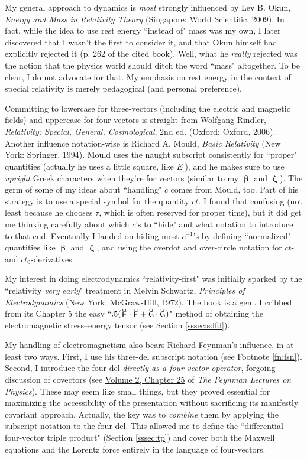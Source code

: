 \documentclass[12pt]{article}
\newcommand{\vvbeta}{\bm{\upbeta}}
\newcommand{\vvzeta}{\bm{\upzeta}}
\newcommand{\tightoverset}[2]{%
  \mathop{#2}\limits^{\vbox to -.5ex{\kern-0.75ex\hbox{$#1$}\vss}}}
\newcommand{\inlinedy}[1]{\tightoverset{\text{\tiny$\bm\leftrightarrow$}}{#1}}
\begin{document}
My general approach to dynamics is \emph{most} strongly influenced by Lev B. Okun, \emph{Energy and Mass in Relativity Theory} (Singapore: World Scientific, 2009). In fact, while the idea to use rest energy ``instead of" mass was my own, I later discovered that I wasn't the first to consider it, and that Okun himself had explicitly rejected it (p. 262 of the cited book). Well, what he \emph{really} rejected was the notion that the physics world should ditch the word ``mass" altogether. To be clear, I do not advocate for that. My emphasis on rest energy in the context of special relativity is merely pedagogical (and personal preference).

Committing to lowercase for three-vectors (including the electric and magnetic fields) and uppercase for four-vectors is straight from Wolfgang Rindler, \emph{Relativity: Special, General, Cosmological}, 2nd ed. (Oxford: Oxford, 2006). Another influence notation-wise is Richard A. Mould, \emph{Basic Relativity} (New York: Springer, 1994). Mould uses the naught subscript consistently for ``proper" quantities (actually he uses a little square, like $E_{{}_\square}$), and he makes sure to use \emph{upright} Greek characters when they're for vectors (similar to my $\vvbeta$ and $\vvzeta$). The germ of some of my ideas about ``handling" $c$ comes from Mould, too. Part of his strategy is to use a special symbol for the quantity $ct$. I found that confusing (not least because he chooses $\tau$, which is often reserved for proper time), but it did get me thinking carefully about which $c$'s to ``hide" and what notation to introduce to that end. Eventually I landed on hiding most $c^{-1}$'s by defining ``normalized" quantities like $\vvbeta$ and $\vvzeta$, and using the overdot and over-circle notation for $ct$- and $ct_0$-derivatives.

My interest in doing electrodynamics ``relativity-first" was initially sparked by the ``relativity \emph{very early}" treatment in Melvin Schwartz, \emph{Principles of Electrodynamics} (New York: McGraw-Hill, 1972). The book is a gem. I cribbed from its Chapter 5 the easy ``$.5 ( \inlinedy{\mathsf{F}} \cdot \inlinedy{\mathsf{F}} + \inlinedy{\mathsf{G}} \cdot \inlinedy{\mathsf{G}} )$" method of obtaining the electromagnetic stress--energy tensor (see Section \ref{sssec:sdfd}).

My handling of electromagnetism also bears Richard Feynman's influence, in at least two ways. First, I use his three-del subscript notation (see Footnote \ref{fn:fsn}). Second, I introduce the four-del \emph{directly as a four-vector operator}, forgoing discussion of covectors (see \href{http://www.feynmanlectures.caltech.edu/II_25.html#Ch25-S3}{Volume 2, Chapter 25} of \emph{The Feynman Lectures on Physics}). These may seem like small things, but they proved essential for maximizing the accessibility of the presentation without sacrificing its manifestly covariant approach. Actually, the key was to \emph{combine} them by applying the subscript notation to the four-del. This allowed me to define the ``differential four-vector triple product" (Section \ref{sssec:tp}) and cover both the Maxwell equations and the Lorentz force entirely in the language of four-vectors.
\end{document}
